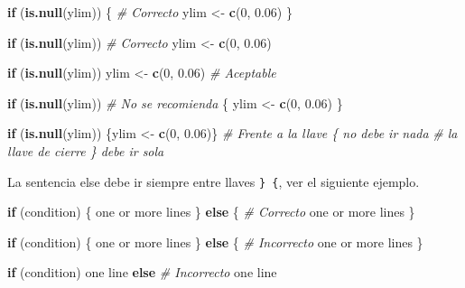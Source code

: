 \documentclass[10pt,]{krantz}
\makeatletter
\newenvironment{Shaded}{\begin{snugshade}}{\end{snugshade}}
\newcommand{\KeywordTok}[1]{\textcolor[rgb]{0.13,0.29,0.53}{\textbf{#1}}}
\newcommand{\DecValTok}[1]{\textcolor[rgb]{0.00,0.00,0.81}{#1}}
\newcommand{\FloatTok}[1]{\textcolor[rgb]{0.00,0.00,0.81}{#1}}
\newcommand{\StringTok}[1]{\textcolor[rgb]{0.31,0.60,0.02}{#1}}
\newcommand{\CommentTok}[1]{\textcolor[rgb]{0.56,0.35,0.01}{\textit{#1}}}
\newcommand{\ControlFlowTok}[1]{\textcolor[rgb]{0.13,0.29,0.53}{\textbf{#1}}}
\newcommand{\NormalTok}[1]{#1}
\newenvironment{kframe}{%
\medskip{}
\setlength{\fboxsep}{.8em}
 \def\at@end@of@kframe{}%
 \ifinner\ifhmode%
  \def\at@end@of@kframe{\end{minipage}}%
  \begin{minipage}{\columnwidth}%
 \fi\fi%
 \def\FrameCommand##1{\hskip\@totalleftmargin \hskip-\fboxsep
 \colorbox{shadecolor}{##1}\hskip-\fboxsep
     \hskip-\linewidth \hskip-\@totalleftmargin \hskip\columnwidth}%
 \MakeFramed {\advance\hsize-\width
   \@totalleftmargin\z@ \linewidth\hsize
   \@setminipage}}%
 {\par\unskip\endMakeFramed%
 \at@end@of@kframe}
\renewenvironment{Shaded}{\begin{kframe}}{\end{kframe}}
\makeatother
\begin{document}
\begin{Shaded}
\begin{Highlighting}[]
\ControlFlowTok{if}\NormalTok{ (}\KeywordTok{is.null}\NormalTok{(ylim)) \{                     }\CommentTok{# Correcto}
\NormalTok{  ylim <-}\StringTok{ }\KeywordTok{c}\NormalTok{(}\DecValTok{0}\NormalTok{, }\FloatTok{0.06}\NormalTok{)}
\NormalTok{\}}

\ControlFlowTok{if}\NormalTok{ (}\KeywordTok{is.null}\NormalTok{(ylim))                       }\CommentTok{# Correcto}
\NormalTok{  ylim <-}\StringTok{ }\KeywordTok{c}\NormalTok{(}\DecValTok{0}\NormalTok{, }\FloatTok{0.06}\NormalTok{)}

\ControlFlowTok{if}\NormalTok{ (}\KeywordTok{is.null}\NormalTok{(ylim)) ylim <-}\StringTok{ }\KeywordTok{c}\NormalTok{(}\DecValTok{0}\NormalTok{, }\FloatTok{0.06}\NormalTok{)    }\CommentTok{# Aceptable}

\ControlFlowTok{if}\NormalTok{ (}\KeywordTok{is.null}\NormalTok{(ylim))                       }\CommentTok{# No se recomienda}
\NormalTok{\{        }
\NormalTok{  ylim <-}\StringTok{ }\KeywordTok{c}\NormalTok{(}\DecValTok{0}\NormalTok{, }\FloatTok{0.06}\NormalTok{)}
\NormalTok{\}}
    
\ControlFlowTok{if}\NormalTok{ (}\KeywordTok{is.null}\NormalTok{(ylim)) \{ylim <-}\StringTok{ }\KeywordTok{c}\NormalTok{(}\DecValTok{0}\NormalTok{, }\FloatTok{0.06}\NormalTok{)\}}
\CommentTok{# Frente a la llave \{ no debe ir nada}
\CommentTok{# la llave de cierre \} debe ir sola}
\end{Highlighting}
\end{Shaded}

La sentencia else debe ir siempre entre llaves \texttt{\}\ \{}, ver el
siguiente ejemplo.

\begin{Shaded}
\begin{Highlighting}[]
\ControlFlowTok{if}\NormalTok{ (condition) \{         }
\NormalTok{  one or more lines}
\NormalTok{\} }\ControlFlowTok{else}\NormalTok{ \{                 }\CommentTok{# Correcto}
\NormalTok{  one or more lines}
\NormalTok{\}}


\ControlFlowTok{if}\NormalTok{ (condition) \{         }
\NormalTok{  one or more lines}
\NormalTok{\}}
\ControlFlowTok{else}\NormalTok{ \{                   }\CommentTok{# Incorrecto}
\NormalTok{  one or more lines}
\NormalTok{\}}


\ControlFlowTok{if}\NormalTok{ (condition)           }
\NormalTok{  one line}
\ControlFlowTok{else}                     \CommentTok{# Incorrecto}
\NormalTok{  one line}
\end{Highlighting}
\end{Shaded}
\end{document}
